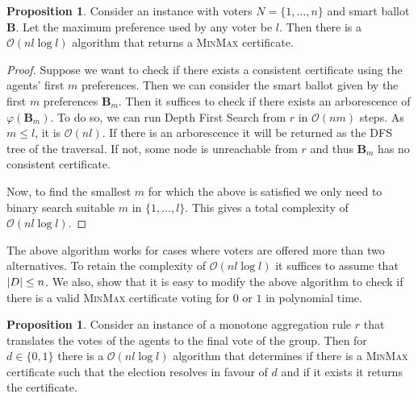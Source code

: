 \documentclass[11pt,a4paper, titlepage]{article}
\DeclarePairedDelimiter\abs{\lvert}{\rvert}
\theoremstyle{definition}
\newtheorem{proposition}[theorem]{Proposition}
\let\vec\mathbf
\begin{document}
\begin{proposition}
    Consider an instance with voters $N = \{1, \ldots, n\}$ and smart ballot $\vec{B}$. 
    Let the maximum preference used by any voter be $l$.
    Then there is a $\mathcal{O}(nl \log l)$ algorithm that returns a \textsc{MinMax} certificate.
\end{proposition}

\begin{proof}
    Suppose we want to check if there exists a consistent certificate using the agents' first $m$ preferences. Then we can consider the smart ballot given by the first $m$ preferences $\vec{B}_m$.
    Then it suffices to check if there exists an arborescence of $\varphi(\vec{B}_m)$.
    To do so, we can run Depth First Search from $r$ in $\mathcal{O}(nm)$ steps. As $m \leq l$, it is $\mathcal{O}(nl)$.
    If there is an arborescence it will be returned as the DFS tree of the traversal. If not, some node is unreachable from $r$ and thus $\vec{B}_m$ has no consistent certificate.

    Now, to find the smallest $m$ for which the above is satisfied we only need to binary search suitable $m$ in $\{1, \ldots, l\}$.
    This gives a total complexity of $\mathcal{O}(nl \log l)$.

\end{proof}

The above algorithm works for cases where voters are offered more than two alternatives.
To retain the complexity of $\mathcal{O}(nl \log l)$ it suffices to assume that $\abs{D} \leq n$.
We also, show that it is easy to modify the above algorithm to check if there is a valid \textsc{MinMax} certificate voting for $0$ or $1$ in polynomial time.


\begin{proposition}
    Consider an instance of a monotone aggregation rule $r$ that translates the votes of the agents to the final vote of the group. 
    Then for $d \in \{0, 1\}$ there is a $\mathcal{O}(nl \log l)$ algorithm that determines if there is a \textsc{MinMax} certificate such that the election resolves in favour of $d$ and if it exists it returns the certificate.
\end{proposition}
\end{document}
